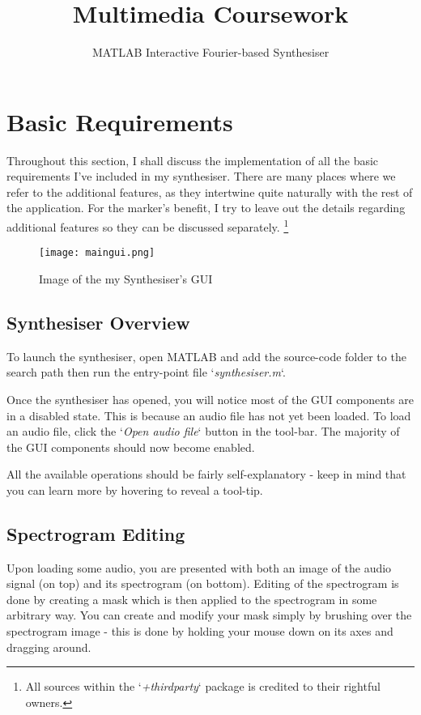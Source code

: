 \documentclass{coursework}
\title{Multimedia Coursework}
\subtitle{MATLAB Interactive Fourier-based Synthesiser}
\begin{document}
	\maketitlepage
	
	\tableofcontents
	
	\section{Basic Requirements}
		Throughout this section, I shall discuss the implementation of all the basic requirements I've included in my synthesiser. There are many places where we refer to the additional features, as they intertwine quite naturally with the rest of the application. For the marker's benefit, I try to leave out the details regarding additional features so they can be discussed separately. \footnote{All sources within the `\textit{+thirdparty}` package is credited to their rightful owners.}
		
		\begin{figure}[H]
			\centering
			\texttt{[image: maingui.png]}
			\caption{Image of the my Synthesiser's GUI} \label{fig:image-maingui}
		\end{figure}
	
		\newpage
		
		\subsection{Synthesiser Overview}
			To launch the synthesiser, open MATLAB and add the source-code folder to the search path then run the entry-point file `\textit{synthesiser.m}`.
			
			Once the synthesiser has opened, you will notice most of the GUI components are in a disabled state. This is because an audio file has not yet been loaded. To load an audio file, click the `\textit{Open audio file}` button in the tool-bar. The majority of the GUI components should now become enabled.
			
			All the available operations should be fairly self-explanatory - keep in mind that you can learn more by hovering to reveal a tool-tip.
			
		\subsection{Spectrogram Editing}
			Upon loading some audio, you are presented with both an image of the audio signal (on top) and its spectrogram (on bottom). Editing of the spectrogram is done by creating a mask which is then applied to the spectrogram in some arbitrary way. You can create and modify your mask simply by brushing over the spectrogram image - this is done by holding your mouse down on its axes and dragging around.
			
\end{document}
